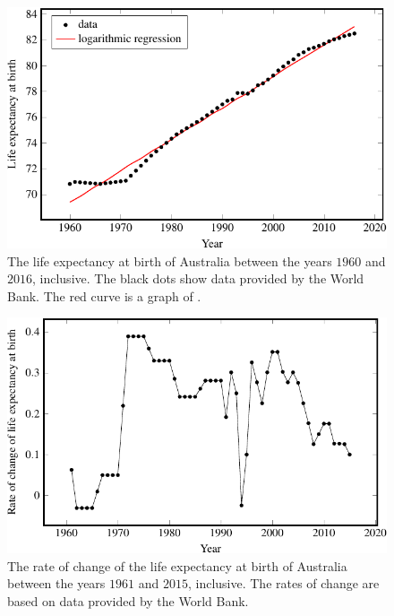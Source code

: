 \documentclass[a4paper,oneside,12pt]{article}
\begin{document}
\begin{problem}
{\begin{solution}
\begin{figure}[!htbp]
\centering
\includegraphics[scale=1.1]{image/12/Australia-life-expectancy.pdf}
\caption{%
  The life expectancy at birth of Australia between the years $1960$
  and $2016$, inclusive.  The black dots show data provided by the
  World Bank.  The red curve is a graph of
  .
}
\label{fig:logarithm:Australia_life_expectancy}
\end{figure}

\begin{figure}[!htbp]
\centering
\includegraphics[scale=1.1]{image/12/Australia-life-expectancy-delta.pdf}
\caption{%
  The rate of change of the life expectancy at birth of Australia
  between the years $1961$ and $2015$, inclusive.  The rates of change
  are based on data provided by the World Bank.
}
\label{fig:logarithm:Australia_rate_of_change_life_expectancy}
\end{figure}


\end{solution}}
\end{problem}
\end{document}
